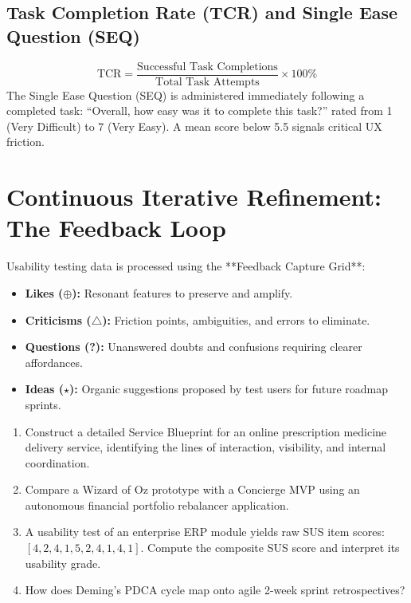 \subsection{Task Completion Rate (TCR) and Single Ease Question (SEQ)}
\[
\text{TCR} = \frac{\text{Successful Task Completions}}{\text{Total Task Attempts}} \times 100\%
\]
The Single Ease Question (SEQ) is administered immediately following a completed task: ``Overall, how easy was it to complete this task?'' rated from 1 (Very Difficult) to 7 (Very Easy). A mean score below 5.5 signals critical UX friction.

\section{Continuous Iterative Refinement: The Feedback Loop}
Usability testing data is processed using the **Feedback Capture Grid**:
\begin{itemize}
    \item \textbf{Likes ($\oplus$):} Resonant features to preserve and amplify.
    \item \textbf{Criticisms ($\triangle$):} Friction points, ambiguities, and errors to eliminate.
    \item \textbf{Questions (?):} Unanswered doubts and confusions requiring clearer affordances.
    \item \textbf{Ideas ($\star$):} Organic suggestions proposed by test users for future roadmap sprints.
\end{itemize}

\begin{practiceset}
\begin{enumerate}[leftmargin=1.5em]
    \item Construct a detailed Service Blueprint for an online prescription medicine delivery service, identifying the lines of interaction, visibility, and internal coordination.
    \item Compare a Wizard of Oz prototype with a Concierge MVP using an autonomous financial portfolio rebalancer application.
    \item A usability test of an enterprise ERP module yields raw SUS item scores: $[4, 2, 4, 1, 5, 2, 4, 1, 4, 1]$. Compute the composite SUS score and interpret its usability grade.
    \item How does Deming's PDCA cycle map onto agile 2-week sprint retrospectives?
\end{enumerate}
\end{practiceset}
